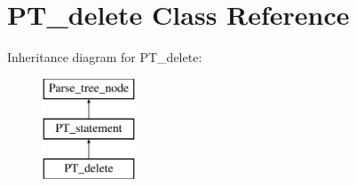 \hypertarget{classPT__delete}{}\section{P\+T\+\_\+delete Class Reference}
\label{classPT__delete}
Inheritance diagram for P\+T\+\_\+delete\+:\begin{figure}[H]
\begin{center}
\leavevmode
\includegraphics[height=3.000000cm]{classPT__delete}
\end{center}
\end{figure}

